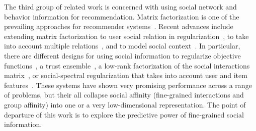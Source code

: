 The third group of related work is concerned with using social network
and behavior information for recommendation.  Matrix factorization is
one of the prevailing approaches for recommender
systems~\cite{koren2009matrix,sorec}. Recent advances include
extending matrix factorization to user social relation in
regularization~\cite{sr,rrmf}, to take into account multiple
relations~\cite{tf,Jiang2012SRA}, and to model social
context~\cite{Jiang2012SCR}.  In particular, there are different
designs for using social information to regularize objective
functions~\cite{lla}, a trust ensemble~\cite{ste}, a low-rank
factorization of the social interactions matrix~\cite{sorec}, or
social-spectral regularization that takes into account user and item
features~\cite{Noel2012NOF}.  These systems have shown very promising
performance across a range of problems, but their all collapse social
affinity (fine-grained interactions and group affinity) into one or a
very low-dimensional representation. The point of departure of this
work is to explore the predictive power of fine-grained social
information.




